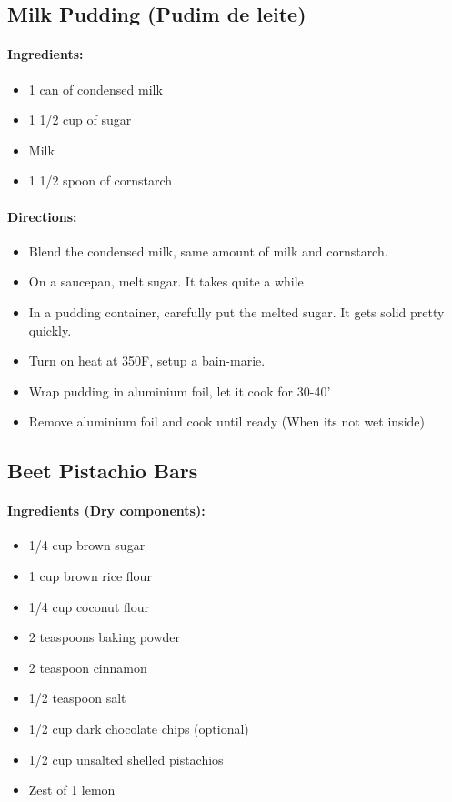 \documentclass{article}
\begin{document}
\subsection{Milk Pudding (Pudim de leite)}

\paragraph{Ingredients:}
\begin{itemize}
    \item 1 can of condensed milk
    \item 1 1/2 cup of sugar
    \item Milk
    \item 1 1/2 spoon of cornstarch
\end{itemize}

\paragraph{Directions:}
\begin{itemize}
    \item Blend the condensed milk, same amount of milk and cornstarch.
    \item On a saucepan, melt sugar. It takes quite a while
    \item In a pudding container, carefully put the melted sugar. It gets solid pretty quickly.
    \item Turn on heat at 350F, setup a bain-marie.
    \item Wrap pudding in aluminium foil, let it cook for 30-40'
    \item Remove aluminium foil and cook until ready (When its not wet inside)
\end{itemize}

\subsection{Beet Pistachio Bars} 

\paragraph{Ingredients (Dry components):}
\begin{itemize}
    \item 1/4 cup brown sugar
    \item 1 cup brown rice flour
    \item 1/4 cup coconut flour
    \item 2 teaspoons baking powder
    \item 2 teaspoon cinnamon
    \item 1/2 teaspoon salt
    \item 1/2 cup dark chocolate chips (optional)
    \item 1/2 cup unsalted shelled pistachios
    \item Zest of 1 lemon
\end{itemize}  
\end{document}
